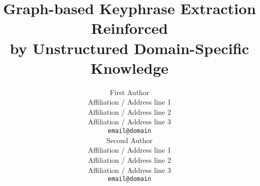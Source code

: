 \documentclass[11pt]{article}
\title{Graph-based Keyphrase Extraction Reinforced\\by Unstructured Domain-Specific Knowledge}
\author{First Author \\
  Affiliation / Address line 1 \\
  Affiliation / Address line 2 \\
  Affiliation / Address line 3 \\
  {\tt email@domain} \\\And
  Second Author \\
  Affiliation / Address line 1 \\
  Affiliation / Address line 2 \\
  Affiliation / Address line 3 \\
  {\tt email@domain} \\}
\date{}
\newcommand\FILL[1]{\textcolor{red}{\lipsum[#1]}}
\begin{document}
  \maketitle

  \begin{abstract}
    \FILL{1}
  \end{abstract}

  
  
  
  
  
  


  
  
\end{document}
